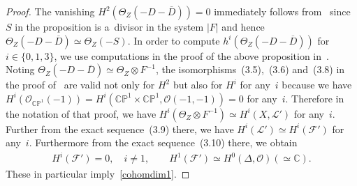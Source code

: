 \documentclass[11pt]{article}
\numberwithin{equation}{section}
\begin{document}
\begin{proof}
The vanishing $H^2( \Theta_Z(-D-\overline D) ) = 0$ immediately follows from~\cite[Proposition~3.1]{HonCMP2} since $S$ in the
proposition is a~divisor in the system $|F|$ and hence $\Theta_Z(-D-\overline D)\simeq\Theta_Z(-S)$.
In order to compute $h^i(\Theta_Z(-D-\overline D) )$ for $i\in \{0,1,3\}$,
we use computations in the proof of the above proposition in~\cite{HonCMP2}.
Noting $\Theta_Z (-D-\overline D ) \simeq \Theta_Z\otimes F^{-1}$, the isomorphisms~(3.5),~(3.6) and~(3.8) in the proof
of~\cite[Proposition~3.1]{HonCMP2} are valid not only for $H^2$ but also for $H^i$ for any~$i$ because we have $H^i(\mathscr
O_{\mathbb{CP}^1} (-1))=H^i({\mathbb{CP}^1\times\mathbb{CP}^1},\mathscr O(-1,-1))=0$ for any~$i$.
Therefore in the notation of that proof, we have $H^i(\Theta_Z\otimes F^{-1}) \simeq H^i(X,\mathscr L')$ for any~$i$.
Further from the exact sequence~(3.9) there, we have $H^i(\mathscr L')\simeq H^i(\mathscr F')$ for any~$i$.
Furthermore from the exact sequence~(3.10) there, we obtain
\begin{gather*}
H^i(\mathscr F') = 0,
\quad
i\neq 1,
\qquad
H^1(\mathscr F')\simeq H^0(\Delta,\mathscr O)  (\simeq\mathbb{C}).
\end{gather*}
These in particular imply~\eqref{cohomdim1}.


\end{proof}
\end{document}
